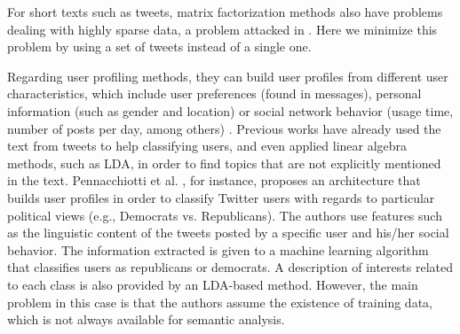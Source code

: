 For short texts such as tweets, matrix factorization methods also have problems dealing with highly sparse data, a problem attacked in \cite{cheng:2013}. Here we minimize this problem by using a set of tweets instead of a single one. 





Regarding user profiling methods, they can build user profiles from different
user characteristics, which include user preferences (found in messages),
personal information (such as gender and location) or social network behavior
(usage time, number of posts per day, among others)
\cite{tao:2011,pennacchiotti2011democrats}.  Previous works have
already used the text from tweets to help classifying users, and even applied
linear algebra methods, such as LDA, in order to find topics that are not
explicitly mentioned in the text. Pennacchiotti et al.
\cite{pennacchiotti2011democrats}, for instance, proposes an architecture that
builds user profiles in order to classify Twitter users with regards to
particular political views (e.g., Democrats vs.  Republicans).  The authors use
features such as the linguistic content of the tweets posted by a specific user
and his/her social behavior. The information extracted is given to a machine
learning algorithm that classifies users as republicans or democrats.  A
description of interests related to each class is also provided by an LDA-based
method. However, the main problem in this case is that the authors assume the
existence of training data, which is not always available for semantic
analysis. 

